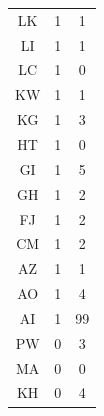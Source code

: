 {\begin{table}[ht]
{{\begin{tabular}{c|cc}
            LK & 1 & 1\\
            LI & 1 & 1\\
            LC & 1 & 0\\
            KW & 1 & 1\\
            KG & 1 & 3\\
            HT & 1 & 0\\
            GI & 1 & 5\\
            GH & 1 & 2\\
            FJ & 1 & 2\\
            CM & 1 & 2\\
            AZ & 1 & 1\\
            AO & 1 & 4\\
            AI & 1 & 99\\
            PW & 0 & 3\\
            MA & 0 & 0\\
            KH & 0 & 4\\
            \bottomrule
        \end{tabular}}}
    \end{table}
}

